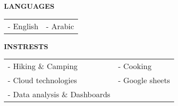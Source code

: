 \medskip
\divider

\textcolor{VividPurple}{\textbf{LANGUAGES}}
\medskip

\begin{tabular}{ l l } 
	- English & - Arabic \\
\end{tabular}  


\divider

\textcolor{VividPurple}{\textbf{INSTRESTS}}
\medskip

\begin{tabular}{ l l } 
	- Hiking \& Camping             & - Cooking       		\\
	- Cloud technologies 			& - Google sheets    	\\
	- Data analysis \& Dashboards
\end{tabular}


\medskip
\medskip

\mbox{}\hfill \small \href{https://github.com/MichaelSafwatHanna/cv}{\textcolor{accent}{\faCode}}